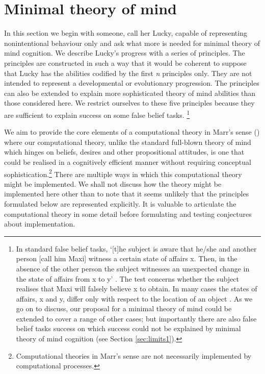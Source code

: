 \documentclass[12pt,\papersize]{extarticle}
\begin{document}







\section{Minimal theory of mind}
\label{sec:minimal}
In this section we begin with someone, call her Lucky, capable  of representing nonintentional behaviour only and ask what more is needed for minimal theory of mind cognition.  We describe Lucky’s progress with a series of principles. The principles are constructed in such a way that it would be coherent to suppose that Lucky has the abilities codified by the first \textit{n} principles only. They are not intended to represent a developmental or evolutionary progression.  The principles can also be extended to explain more sophisticated theory of mind abilities than those considered here.  We restrict ourselves to these five principles because they are sufficient to explain success on some false belief tasks.%
\footnote{
In standard false belief tasks, `[t]he subject is aware that he/she and another person [call him Maxi] witness a certain state of affairs x.  Then, in the absence of the other person the subject witnesses an unexpected change in the state of affairs from x to y' \citep[][p.\ 106]{en_89}.  The test concerns whether the subject realises that Maxi will falsely believe x to obtain.  In many cases the states of affairs, x and y, differ only with respect to the location of an object \citep[e.g.][]{en_1092, en_1208, en_1824}. 
As we go on to discuss, our proposal for a minimal theory of mind could be extended to cover a range of other cases;
but importantly there are also false belief tasks success on which success could not be explained by minimal theory of mind cognition (see Section \vref{sec:limits1}).
}


	We aim to provide the core elements of a computational theory in Marr’s sense (\citeyear[][pp.\ 15-29]{en_917}) where our computational theory, unlike the standard full-blown theory of mind which hinges on beliefs, desires and other propositional attitudes, is one that could be realised in a cognitively efficient manner without requiring conceptual sophistication.\footnote{ 	Computational theories in Marr’s sense are not necessarily  implemented by computational processes.}  There are multiple ways in which this computational theory might be implemented.  We shall not discuss how the theory might be implemented here other than to note that it seems unlikely that the principles formulated below are represented explicitly.  It is valuable to articulate the computational theory in some detail before formulating and testing conjectures about implementation.  
\end{document}
